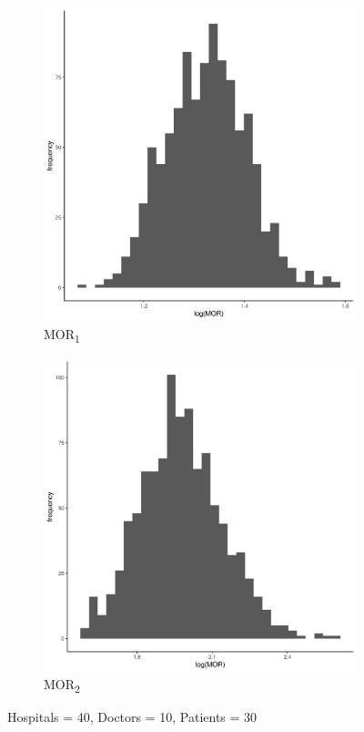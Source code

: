 \documentclass[
  letterpaper,
  DIV=11,
  numbers=noendperiod,
  titlepage]{scrartcl}
\begin{document}
\vspace{10mm}

\begin{figure}
\centering
\begin{subfigure}{.49\textwidth}
    \centering
    \includegraphics[width=.95\linewidth]{../../plots/three-lvl-ran-int/low-prev/hist_40_10_30_three_lvl_low_prev_mor1.png}  
    \caption{MOR\textsubscript{1}}
    \label{l40m10n301}
\end{subfigure}
\begin{subfigure}{.49\textwidth}
    \centering
    \includegraphics[width=.95\linewidth]{../../plots/three-lvl-ran-int/low-prev/hist_40_10_30_three_lvl_low_prev_mor2.png}
    \caption{MOR\textsubscript{2}}
    \label{l40m10n302}
\end{subfigure}
\caption{Hospitals = 40, Doctors = 10, Patients = 30}
\label{mor2}
\end{figure}
\end{document}
